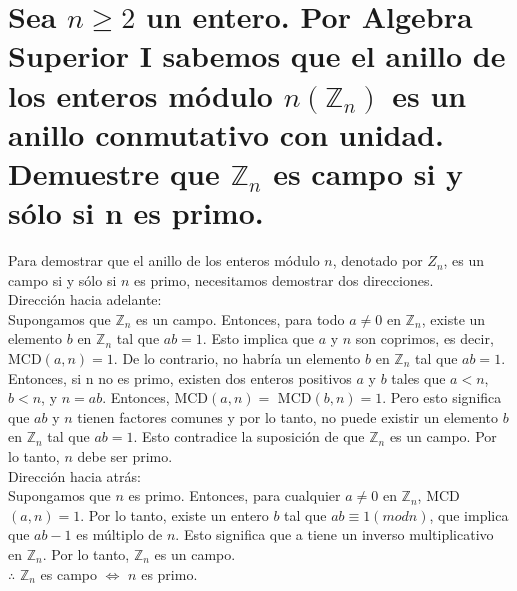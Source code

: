 \section{Sea $n \geq 2$ un entero. Por Algebra Superior I sabemos que el anillo de los enteros módulo $n (\mathbb{Z}_n)$ es un anillo conmutativo con unidad. Demuestre que $\mathbb{Z}_n$ es campo si y sólo si n es primo.}

Para demostrar que el anillo de los enteros módulo $n$,
denotado por $Z_n$, es un campo si y sólo si $n$ es primo,
necesitamos demostrar dos direcciones.\\
Dirección hacia adelante:\\
Supongamos que $\mathbb{Z}_n$ es un campo.
Entonces, para todo $a \neq 0$ en $\mathbb{Z}_n$, existe un elemento $b$ en $\mathbb{Z}_n$ tal que $ab = 1$.
Esto implica que $a$ y $n$ son coprimos, es decir, MCD$(a,n) = 1$. De lo contrario, no habría un elemento $b$ en $\mathbb{Z}_n$ tal que $ab = 1$.
Entonces, si n no es primo, existen dos enteros positivos $a$ y $b$ tales que $a < n$, $b < n$, y $n = ab$. 
Entonces, MCD$(a,n) =$ MCD$(b,n) = 1$. Pero esto significa que $ab$ y $n$ tienen factores comunes y por lo tanto, no puede existir un elemento $b$ en $\mathbb{Z}_n$ tal que $ab = 1$. 
Esto contradice la suposición de que $\mathbb{Z}_n$ es un campo. Por lo tanto, $n$ debe ser primo.\\ 
Dirección hacia atrás:\\
Supongamos que $n$ es primo.
Entonces, para cualquier $a \neq 0$ en $\mathbb{Z}_n$, MCD$(a,n) = 1$. 
Por lo tanto, existe un entero $b$ tal que $ab \equiv 1 (mod n)$, que implica que $ab - 1$ es múltiplo de $n$. 
Esto significa que a tiene un inverso multiplicativo en $\mathbb{Z}_n$. Por lo tanto, $\mathbb{Z}_n$ es un campo.\\
$\therefore$   $\mathbb{Z}_n$ es campo $\Leftrightarrow$ $n$ es primo.
